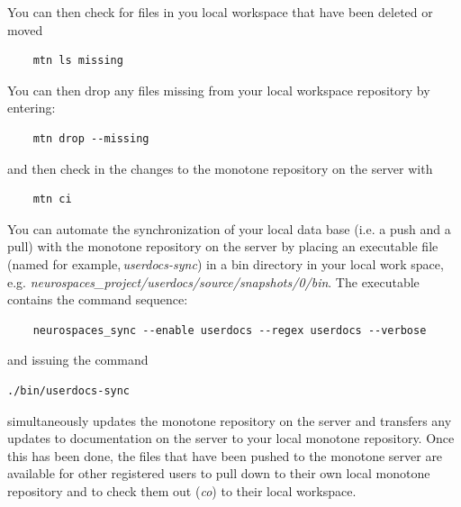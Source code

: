 \documentclass[12pt]{article}
\begin{document}
You can then check for files in you local workspace that have been deleted or moved
\begin{verbatim}
    mtn ls missing
\end{verbatim}
You can then drop any files missing from your local workspace repository by entering:
\begin{verbatim}
    mtn drop --missing
\end{verbatim}
and then check in the changes to the monotone repository on the server with
\begin{verbatim}
    mtn ci
\end{verbatim}
You can automate the synchronization of your local data base (i.e. a push and a pull) with the monotone repository on the server by placing an executable file (named for example,\,{\it userdocs-sync}) in a bin directory in your local work space, e.g. {\it neurospaces\_project/userdocs/source/snapshots/0/bin}. 
The executable contains the command sequence:
\begin{verbatim}
    neurospaces_sync --enable userdocs --regex userdocs --verbose
\end{verbatim}
and issuing the command
\begin{verbatim}
./bin/userdocs-sync
\end{verbatim}
simultaneously updates the monotone repository on the server and transfers any updates to documentation on the server to your local monotone repository. Once this has been done, the files that have been pushed to the monotone server are available for other registered users to pull down to their own local monotone repository and to check them out ({\it co}) to their local workspace.
\end{document}
